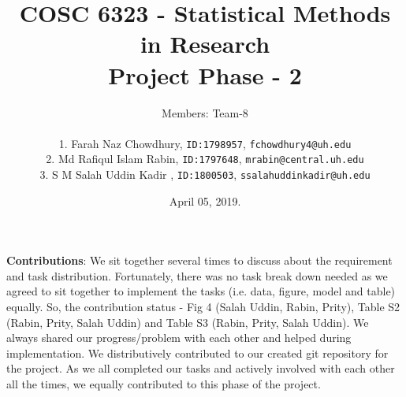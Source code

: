 \documentclass{article}\usepackage[]{graphicx}\usepackage[]{color}
\title{COSC 6323 - Statistical Methods in Research\\Project Phase - 2\\}
\author{%
    Members: Team-8 \\\\
    1. Farah Naz Chowdhury,    \texttt{ID:1798957}, \texttt{fchowdhury4@uh.edu}      \vspace{2pt} \\
    2. Md Rafiqul Islam Rabin, \texttt{ID:1797648}, \texttt{mrabin@central.uh.edu}   \vspace{2pt} \\
    3. S M Salah Uddin Kadir , \texttt{ID:1800503}, \texttt{ssalahuddinkadir@uh.edu} \vspace{2pt} \\
}
\date{April 05, 2019.}
\begin{document}
\maketitle
\par{\textbf{Contributions}: We sit together several times to discuss about the requirement and task distribution. Fortunately, there was no task break down needed as we agreed to sit together to implement the tasks (i.e. data, figure, model and table) equally. So, the contribution status - Fig 4 (Salah Uddin, Rabin, Prity), Table S2 (Rabin, Prity, Salah Uddin) and Table S3 (Rabin, Prity, Salah Uddin). We always shared our progress/problem with each other and helped during implementation. We distributively contributed to our created git repository for the project. As we all completed our tasks and actively involved with each other all the times, we equally contributed to this phase of the project.}


\newpage
\end{document}
